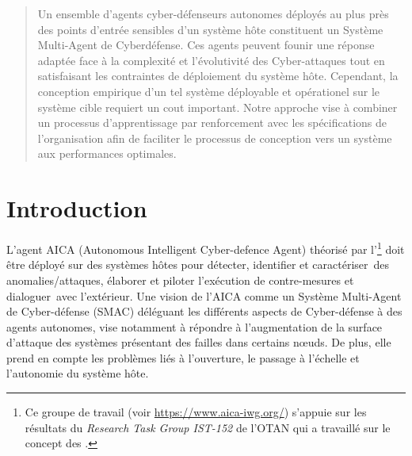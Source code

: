 \documentclass[conference]{IEEEtran}
\begin{document}
\maketitle

\begin{abstract}

    Un ensemble d'agents cyber-défenseurs autonomes déployés au plus près des points d'entrée sensibles d'un système hôte constituent un Système Multi-Agent de Cyberdéfense. Ces agents peuvent founir une réponse adaptée face à la complexité et l'évolutivité des Cyber-attaques tout en satisfaisant les contraintes de déploiement du système hôte.
    Cependant, la conception empirique d'un tel système déployable et opérationel sur le système cible requiert un cout important.
    Notre approche vise à combiner un processus d'apprentissage par renforcement avec les spécifications de l'organisation afin de faciliter le processus de conception vers un système aux performances optimales.

\end{abstract}


\section{Introduction}


L'agent AICA (Autonomous Intelligent Cyber-defence Agent) théorisé par l'\footnote{Ce groupe de travail (voir \url{https://www.aica-iwg.org/}) s'appuie sur les résultats du \textit{Research Task Group IST-152} de l'OTAN qui a travaillé sur le concept des .} doit être déployé sur des systèmes hôtes pour détecter, identifier et caractériser des anomalies/attaques, élaborer et piloter l’exécution de contre-mesures et dialoguer avec l'extérieur.
Une vision de l'AICA comme un Système Multi-Agent de Cyber-défense (SMAC) déléguant les différents aspects de Cyber-défense à des agents autonomes, vise notamment à répondre à l'augmentation de la surface d'attaque des systèmes  présentant des failles dans certains nœuds\cite{kott2018autonomous}. De plus, elle prend en compte les problèmes liés à l'ouverture, le passage à l'échelle et l'autonomie du système hôte.
\end{document}

